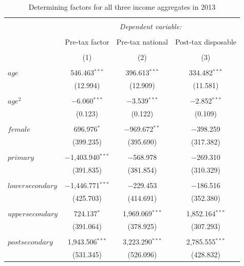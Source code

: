 \documentclass[a4paper]{article}\usepackage[]{graphicx}\usepackage[]{color}
\begin{document}
\begin{table}[H] \centering 
  \caption{Determining factors for all three income aggregates in 2013} 
  \label{ols2013} 
\begin{tabular}{@{\extracolsep{5pt}}lccc} 
\\[-1.8ex]\hline 
\hline \\[-1.8ex] 
 & \multicolumn{3}{c}{\textit{Dependent variable:}} \\ 
\cline{2-4} 
\\[-1.8ex] & Pre-tax factor & Pre-tax national & Post-tax disposable \\ 
\\[-1.8ex] & (1) & (2) & (3)\\ 
\hline \\[-1.8ex] 
 $age$ & 546.463$^{***}$ & 396.613$^{***}$ & 334.482$^{***}$ \\ 
  & (12.994) & (12.909) & (11.581) \\ 
  & & & \\ 
 $age^2$ & $-$6.060$^{***}$ & $-$3.539$^{***}$ & $-$2.852$^{***}$ \\ 
  & (0.123) & (0.122) & (0.109) \\ 
  & & & \\ 
 $female$ & 696.976$^{*}$ & $-$969.672$^{**}$ & $-$398.259 \\ 
  & (399.235) & (395.690) & (317.382) \\ 
  & & & \\ 
 $primary$ & $-$1,403.940$^{***}$ & $-$568.978 & $-$269.310 \\ 
  & (391.835) & (381.854) & (310.329) \\ 
  & & & \\ 
 $lower secondary$ & $-$1,446.771$^{***}$ & $-$229.453 & $-$186.516 \\ 
  & (425.703) & (414.691) & (352.380) \\ 
  & & & \\ 
 $upper secondary$ & 724.137$^{*}$ & 1,969.069$^{***}$ & 1,852.164$^{***}$ \\ 
  & (391.064) & (378.925) & (307.293) \\ 
  & & & \\ 
 $post secondary$ & 1,943.506$^{***}$ & 3,223.290$^{***}$ & 2,785.555$^{***}$ \\ 
  & (531.345) & (526.096) & (428.832) \\ 

\end{tabular}
\end{table}
\end{document}
